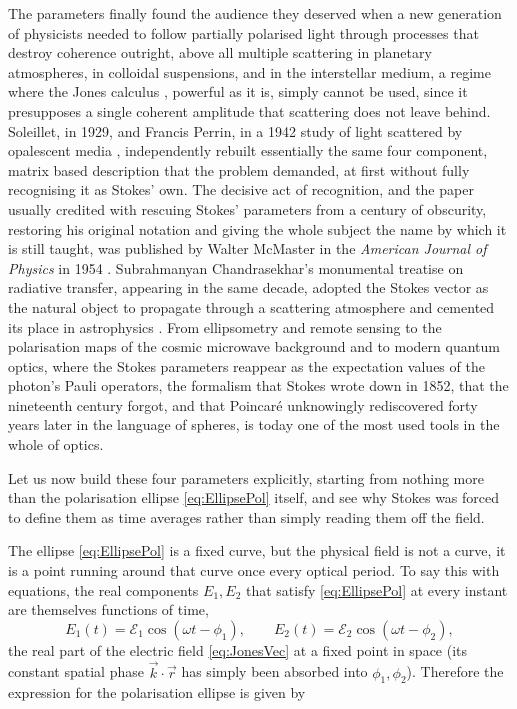         The parameters finally found the audience they deserved when a new generation of physicists needed to follow partially polarised light through processes that destroy coherence outright, above all multiple scattering in planetary atmospheres, in colloidal suspensions, and in the interstellar medium, a regime where the Jones calculus \citep{jones1941new}, powerful as it is, simply cannot be used, since it presupposes a single coherent amplitude that scattering does not leave behind. Soleillet, in 1929, and Francis Perrin, in a 1942 study of light scattered by opalescent media \citep{perrin1942polarization}, independently rebuilt essentially the same four component, matrix based description that the problem demanded, at first without fully recognising it as Stokes' own. The decisive act of recognition, and the paper usually credited with rescuing Stokes' parameters from a century of obscurity, restoring his original notation and giving the whole subject the name by which it is still taught, was published by Walter McMaster in the \textit{American Journal of Physics} in 1954 \citep{mcmaster1954polarization}. Subrahmanyan Chandrasekhar's monumental treatise on radiative transfer, appearing in the same decade, adopted the Stokes vector as the natural object to propagate through a scattering atmosphere and cemented its place in astrophysics \citep{chandrasekhar1950radiative}. From ellipsometry and remote sensing to the polarisation maps of the cosmic microwave background and to modern quantum optics, where the Stokes parameters reappear as the expectation values of the photon's Pauli operators, the formalism that Stokes wrote down in 1852, that the nineteenth century forgot, and that Poincaré unknowingly rediscovered forty years later in the language of spheres, is today one of the most used tools in the whole of optics.

        Let us now build these four parameters explicitly, starting from nothing more than the polarisation ellipse \ref{eq:EllipsePol} itself, and see why Stokes was forced to define them as time averages rather than simply reading them off the field.

        The ellipse \ref{eq:EllipsePol} is a fixed curve, but the physical field is not a curve, it is a point running around that curve once every optical period. To say this with equations, the real components $E_1,E_2$ that satisfy \ref{eq:EllipsePol} at every instant are themselves functions of time,
        \begin{equation}\label{eq:RealFieldComponents}
            E_1(t) = \mathcal{E}_1\cos(\omega t-\phi_1), \qquad E_2(t) = \mathcal{E}_2\cos(\omega t-\phi_2),
        \end{equation}
        the real part of the electric field \ref{eq:JonesVec} at a fixed point in space (its constant spatial phase $\vec k\cdot\vec r$ has simply been absorbed into $\phi_1,\phi_2$). Therefore the expression for the polarisation ellipse is given by

